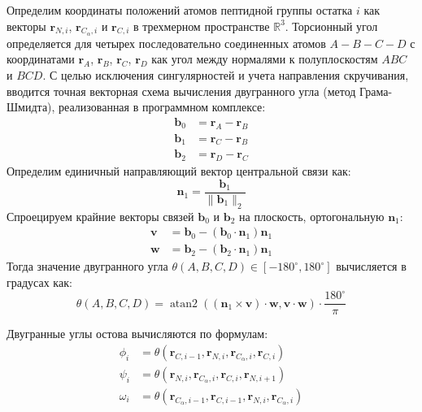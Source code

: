 \documentclass[12pt, a4paper]{article}
\begin{document}
Определим координаты положений атомов пептидной группы остатка $i$ как векторы $\mathbf{r}_{N, i}$, $\mathbf{r}_{C_\alpha, i}$ и $\mathbf{r}_{C, i}$ в трехмерном пространстве $\mathbb{R}^3$.
Торсионный угол определяется для четырех последовательно соединенных атомов $A-B-C-D$ с координатами $\mathbf{r}_A$, $\mathbf{r}_B$, $\mathbf{r}_C$, $\mathbf{r}_D$ как угол между нормалями к полуплоскостям $ABC$ и $BCD$.
С целью исключения сингулярностей и учета направления скручивания, вводится точная векторная схема вычисления двугранного угла (метод Грама-Шмидта), реализованная в программном комплексе:
\begin{align}
    \mathbf{b}_0 &= \mathbf{r}_A - \mathbf{r}_B \\
    \mathbf{b}_1 &= \mathbf{r}_C - \mathbf{r}_B \\
    \mathbf{b}_2 &= \mathbf{r}_D - \mathbf{r}_C
\end{align}
Определим единичный направляющий вектор центральной связи как:
\begin{equation}
    \mathbf{n}_1 = \frac{\mathbf{b}_1}{\|\mathbf{b}_1\|_2}
\end{equation}
Спроецируем крайние векторы связей $\mathbf{b}_0$ и $\mathbf{b}_2$ на плоскость, ортогональную $\mathbf{n}_1$:
\begin{align}
    \mathbf{v} &= \mathbf{b}_0 - (\mathbf{b}_0 \cdot \mathbf{n}_1)\mathbf{n}_1 \\
    \mathbf{w} &= \mathbf{b}_2 - (\mathbf{b}_2 \cdot \mathbf{n}_1)\mathbf{n}_1
\end{align}
Тогда значение двугранного угла $\theta(A, B, C, D) \in [-180^\circ, 180^\circ]$ вычисляется в градусах как:
\begin{equation}
    \theta(A, B, C, D) = \operatorname{atan2}\left( (\mathbf{n}_1 \times \mathbf{v}) \cdot \mathbf{w}, \mathbf{v} \cdot \mathbf{w} \right) \cdot \frac{180^\circ}{\pi}
\end{equation}

Двугранные углы остова вычисляются по формулам:
\begin{align}
    \phi_i &= \theta(\mathbf{r}_{C, i-1}, \mathbf{r}_{N, i}, \mathbf{r}_{C_\alpha, i}, \mathbf{r}_{C, i}) \\
    \psi_i &= \theta(\mathbf{r}_{N, i}, \mathbf{r}_{C_\alpha, i}, \mathbf{r}_{C, i}, \mathbf{r}_{N, i+1}) \\
    \omega_i &= \theta(\mathbf{r}_{C_\alpha, i-1}, \mathbf{r}_{C, i-1}, \mathbf{r}_{N, i}, \mathbf{r}_{C_\alpha, i})
\end{align}
\end{document}
